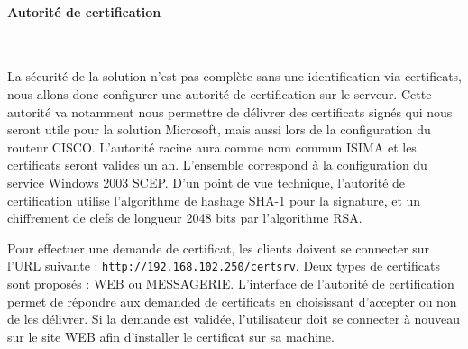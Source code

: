 



\paragraph{Autorité de certification}
\label{autorité_certification}~

La sécurité de la solution n'est pas complète sans une identification via certificats, nous allons donc configurer une autorité de certification sur le serveur. Cette autorité va notamment nous permettre de délivrer des certificats signés qui nous seront utile pour la solution Microsoft, mais aussi lors de la configuration du routeur CISCO. L'autorité racine aura comme nom commun ISIMA et les certificats seront valides un an. L'ensemble correspond à la configuration du service Windows 2003 SCEP. D'un point de vue technique, l'autorité de certification utilise l'algorithme de hashage SHA-1 pour la signature, et un chiffrement de clefs de longueur 2048 bits par l'algorithme RSA.

Pour effectuer une demande de certificat, les clients doivent se connecter sur l'URL suivante : \verb|http://192.168.102.250/certsrv|. Deux types de certificats sont proposés : WEB ou MESSAGERIE. L'interface de l'autorité de certification permet de répondre aux demanded de certificats en choisissant d'accepter ou non de les délivrer. Si la demande est validée, l'utilisateur doit se connecter à nouveau sur le site WEB afin d'installer le certificat sur sa machine.

